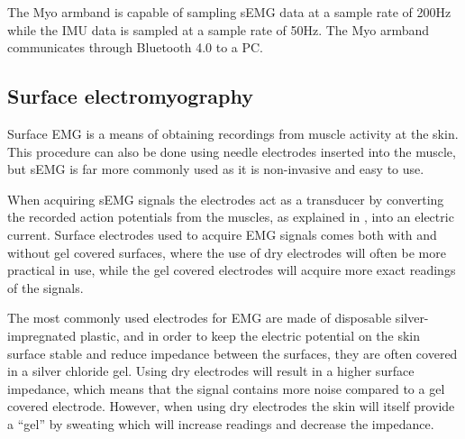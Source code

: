 The Myo armband is capable of sampling sEMG data at a sample rate of 200Hz while the IMU data is sampled at a sample rate of  50Hz. The Myo armband communicates through Bluetooth 4.0 to a PC. 


\subsection{Surface electromyography}

Surface EMG is a means of obtaining recordings from muscle activity at the skin. This procedure can also be done using needle electrodes inserted into the muscle, but sEMG is far more commonly used as it is non-invasive and easy to use. \cite{cram2012}  

When acquiring sEMG signals the electrodes act as a transducer by converting the recorded action potentials from the muscles, as explained in , into an electric current. Surface electrodes used to acquire EMG signals comes both with and without gel covered surfaces, where the use of dry electrodes will often be more practical in use, while the gel covered electrodes will acquire more exact readings of the signals. \cite{lee2008, cram2012}

The most commonly used electrodes for EMG are made of disposable silver-impregnated plastic, and in order to keep the electric potential on the skin surface stable and reduce impedance between the surfaces, they are often covered in a silver chloride gel. Using dry electrodes will result in a higher surface impedance, which means that the signal contains more noise compared to a gel covered electrode. However, when using dry electrodes the skin will itself provide a “gel” by sweating which will increase readings and decrease the impedance. \cite{cram2012}








